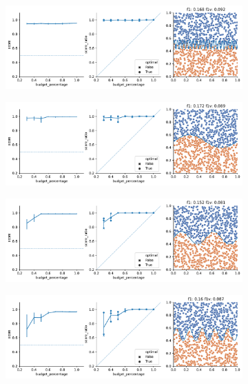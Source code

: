 \begin{figure}
\begin{subfigure}{.5\textwidth}
        \centering
        \includegraphics[width=\textwidth]{img/2d/9.pdf}
    \end{subfigure}%
    \begin{subfigure}{.5\textwidth}
        \centering
        \includegraphics[width=\textwidth]{img/2d/10.pdf}
    \end{subfigure}%
    \hfill
     \begin{subfigure}{.5\textwidth}
        \centering
        \includegraphics[width=\textwidth]{img/2d/11.pdf}
    \end{subfigure}%
    \begin{subfigure}{.5\textwidth}
        \centering
        \includegraphics[width=\textwidth]{img/2d/12.pdf}

\end{subfigure}
\end{figure}
